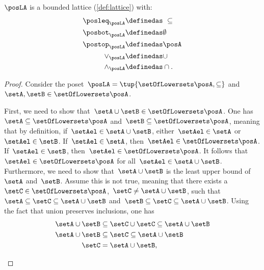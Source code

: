 \begin{lemma}
    $\posLA$ is a bounded lattice (\cref{def:lattice}) with:
    \begin{equation}
        \begin{aligned}
            \posleq_{\posLA} & \definedas \ \subseteq \\
            \posbot_{\posLA} & \definedas \emptyset   \\
            \postop_{\posLA} & \definedas \posA       \\
            \vee_{\posLA}    & \definedas \cup        \\
            \wedge_{\posLA}  & \definedas \cap.       
        \end{aligned}
    \end{equation}
\end{lemma}
\begin{proof}
    Consider the poset~$\posLA=\tup{\setOfLowersets \posA,\subseteq}$ and~$\setA,\setB\in \setOfLowersets \posA$.
    \begin{compactitem}
        \item First, we need to show that~$\setA\cup \setB\in \setOfLowersets \posA$.
        One has~$\setA \subseteq \setOfLowersets \posA$ and~$\setB\subseteq \setOfLowersets \posA$, meaning that by definition, if~$\setAel\in \setA\cup \setB$, either~$\setAel\in \setA$ or~$\setAel\in \setB$.
        If~$\setAel\in \setA$, then~$\setAel\in \setOfLowersets \posA$.
        If~$\setAel\in \setB$, then~$\setAel\in \setOfLowersets \posA$.
        It follows that~$\setAel\in \setOfLowersets \posA$ for all~$\setAel\in \setA\cup \setB$.
        Furthermore, we need to show that~$\setA\cup \setB$ is the least upper bound of~$\setA$ and~$\setB$.
        Assume this is not true, meaning that there exists a~$\setC\in \setOfLowersets \posA$,~$\setC\neq \setA\cup \setB$, such that~$\setA\subseteq \setC\subseteq \setA\cup \setB$ and~$\setB\subseteq \setC\subseteq \setA\cup \setB$.
        Using the fact that union preserves inclusions, one has
        \begin{equation}
            \begin{aligned}
                \setA\cup \setB & \subseteq \setC\cup \setC \subseteq \setA\cup \setB \\
                \setA\cup \setB & \subseteq \setC \subseteq \setA\cup \setB           \\
                \setC           & = \setA\cup \setB,                                  
            \end{aligned}

\end{equation}
\end{compactitem}
\end{proof}
